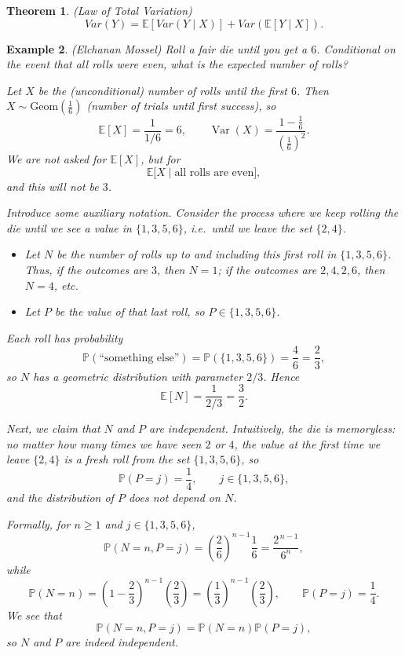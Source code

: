 \documentclass{tufte-handout}
\newcommand*\E{\mathbb{E}}
\renewcommand{\P}{\mathbb{P}}
\newtheorem{thm}{Theorem}[subsection]
\newtheorem{ex}[thm]{Example}
\theoremstyle{definition}
\begin{document}
\begin{thm}
	(Law of Total Variation) 
	\[
		Var(Y) = \E\left[Var(Y\mid X)\right] + Var\left( \E\left[Y \mid X\right]  \right)
	.\] \marginnote{We define $Var(Y \mid X) = \E\left[Y^2 \mid X\right] - \left[ \E\left[Y \mid X\right] ^2 \right] $.}
\end{thm}

\begin{ex}
	(Elchanan Mossel) Roll a fair die until you get a $6$. Conditional on the event that all
	rolls were even, what is the expected number of rolls?

	Let $X$ be the (unconditional) number of rolls until the first $6$.
	Then $X \sim \mathrm{Geom}\!\left(\frac{1}{6}\right)$ (number of trials
	until first success), so
	\[
		\E[X] = \frac{1}{1/6} = 6, \qquad
		\operatorname{Var}(X) = \frac{1-\frac{1}{6}}{\left(\frac{1}{6}\right)^2}.
	\]
	We are not asked for $\E[X]$, but for
	\[
		\E\bigl[X \mid \text{all rolls are even}\bigr],
	\]
	and this will \emph{not} be $3$.

	Introduce some auxiliary notation. Consider the process where we keep
	rolling the die until we see a value in $\{1,3,5,6\}$, i.e.\ until we
	leave the set $\{2,4\}$.

	\begin{itemize}
		\item Let $N$ be the number of rolls up to and including this
		first roll in $\{1,3,5,6\}$.
		Thus, if the outcomes are $3$, then $N=1$; if the outcomes are
		$2,4,2,6$, then $N=4$, etc.
		\item Let $P$ be the value of that last roll, so
		$P \in \{1,3,5,6\}$.
	\end{itemize}

	Each roll has probability
	\[
		\P(\text{``something else''}) = \P(\{1,3,5,6\}) = \frac{4}{6}
		= \frac{2}{3},
	\]
	so $N$ has a geometric distribution with parameter $2/3$. Hence
	\[
		\E[N] = \frac{1}{2/3} = \frac{3}{2}.
	\]

	Next, we claim that $N$ and $P$ are independent. Intuitively, the die
	is memoryless: no matter how many times we have seen $2$ or $4$, the
	value at the first time we leave $\{2,4\}$ is a fresh roll from the
	set $\{1,3,5,6\}$, so
	\[
		\P(P = j) = \frac{1}{4}, \qquad j \in \{1,3,5,6\},
	\]
	and the distribution of $P$ does not depend on $N$.

	Formally, for $n \ge 1$ and $j \in \{1,3,5,6\}$,
	\[
		\P(N=n, P=j)
		= \left(\frac{2}{6}\right)^{n-1} \frac{1}{6}
		= \frac{2^{\,n-1}}{6^n},
	\]
	while
	\[
		\P(N=n)
		= \left(1-\frac{2}{3}\right)^{n-1}\!\left(\frac{2}{3}\right)
		= \left(\frac{1}{3}\right)^{n-1}\!\left(\frac{2}{3}\right),
		\qquad
		\P(P=j) = \frac{1}{4}.
	\]
	We see that
	\[
		\P(N=n, P=j) = \P(N=n)\P(P=j),
	\]
	so $N$ and $P$ are indeed independent.


\end{ex}
\end{document}
